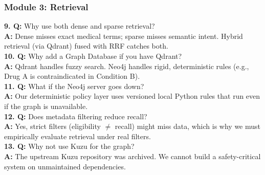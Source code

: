 \documentclass[11pt,a4paper]{article}
\begin{document}
\subsubsection{Module 3: Retrieval}
\textbf{9. Q:} Why use both dense and sparse retrieval? \\
\textbf{A:} Dense misses exact medical terms; sparse misses semantic intent. Hybrid retrieval (via Qdrant) fused with RRF catches both. \\
\textbf{10. Q:} Why add a Graph Database if you have Qdrant? \\
\textbf{A:} Qdrant handles fuzzy search. Neo4j handles rigid, deterministic rules (e.g., Drug A is contraindicated in Condition B). \\
\textbf{11. Q:} What if the Neo4j server goes down? \\
\textbf{A:} Our deterministic policy layer uses versioned local Python rules that run even if the graph is unavailable. \\
\textbf{12. Q:} Does metadata filtering reduce recall? \\
\textbf{A:} Yes, strict filters (eligibility $\neq$ recall) might miss data, which is why we must empirically evaluate retrieval under real filters. \\
\textbf{13. Q:} Why not use Kuzu for the graph? \\
\textbf{A:} The upstream Kuzu repository was archived. We cannot build a safety-critical system on unmaintained dependencies.
\end{document}
